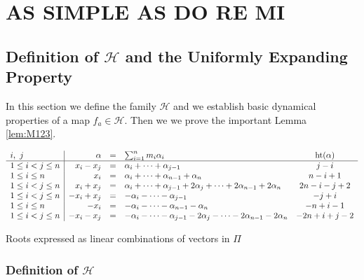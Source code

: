 \chapter{AS SIMPLE AS DO RE MI}

\section{Definition of \texorpdfstring{$\mathcal{H}$}{H} and the Uniformly
  Expanding Property}


In this section we define the family $\mathcal{H}$ and we establish basic
dynamical properties of a map $f_a\in \mathcal{H}.$ Then we we prove the
important Lemma \ref{lem:M123}.

\begin{table}[h!tb]
  \footnotesize {}
  \renewcommand{\arraystretch}{1.3}
  \begin{equation*}
    \begin{array}{l|rclc}
      i,\ j &\alpha&=&\sum_{i=1}^n m_i\alpha_i&{\operatorname{ht}}(\alpha)\\\hline
      1\leq i< j\leq n&  x_i-x_j& =& \alpha_{i}+ \dots +\alpha_{j-1}& j-i \\
      1\leq i\leq n& x_i&=& \alpha_i+\dots +\alpha_{n-1}+ \alpha_n &
      n-i+1\\ 
      1\leq i< j\leq n& x_i+x_j&=& \alpha_i+ \dots +\alpha_{j-1} + 2\alpha_j+
      \dots +2\alpha_{n-1} +2\alpha_n& 2n-i-j+2 \\ 
      1\leq i< j\leq n& - x_i+x_j& =& -\alpha_{i}- \dots -\alpha_{j-1}& -j+i \\
      1\leq i\leq n& -x_i &= &-\alpha_i-\dots -\alpha_{n-1}- \alpha_n &
      -n+i-1\\ 
      1\leq i< j\leq n&  -x_i-x_j&=& -\alpha_i- \dots -\alpha_{j-1} - 2\alpha_j-
      \dots -2\alpha_{n-1} -2\alpha_n& -2n+i+j-2   
    \end{array}  
  \end{equation*}
  \caption{Roots expressed as linear combinations of vectors in
    $\Pi$}\label{tab:xxx} 
\end{table}


\subsection{Definition of \texorpdfstring{$\mathcal{H}$}{H}}
\label{subsec:pnk}

